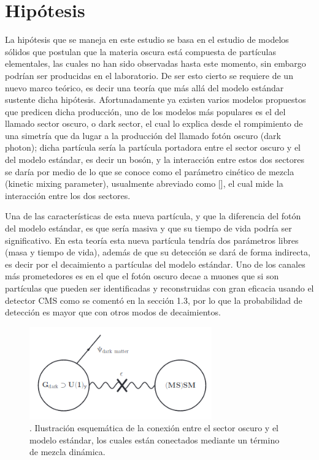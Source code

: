 \chapter{Hipótesis}

La hipótesis que se maneja en este estudio se basa en el estudio de modelos sólidos que postulan que la materia oscura está compuesta de partículas elementales, las cuales no han sido observadas hasta este momento, sin embargo podrían ser producidas en el laboratorio. De ser esto cierto se requiere de un nuevo marco teórico, es decir una teoría que más allá del modelo estándar sustente dicha hipótesis.
Afortunadamente ya existen varios modelos propuestos que predicen dicha
producción, uno de los modelos más populares es el del llamado sector oscuro, o dark sector, el cual lo explica desde el rompimiento de una simetría que da lugar a la producción del llamado fotón oscuro (dark photon); dicha partícula sería la partícula portadora entre el sector oscuro y el del modelo estándar, es decir un bosón, y la interacción entre estos dos sectores se daría por medio de lo que se conoce como el parámetro cinético de mezcla (kinetic mixing parameter), usualmente abreviado como [], el cual mide la interacción entre los dos sectores.

Una de las características de esta nueva partícula, y que la diferencia del fotón del modelo estándar, es que sería masiva y que su tiempo de vida podría ser significativo. En esta teoría esta nueva partícula tendría dos parámetros libres (masa y tiempo de vida), además de que su detección se dará de forma indirecta, es decir por el decaimiento a partículas del modelo estándar. Uno de los canales más prometedores es en el que el fotón oscuro decae a muones que si son partículas que pueden ser identificadas y reconstruidas con gran eficacia usando el detector CMS como se comentó en la sección 1.3, por lo que la probabilidad de detección es mayor que con otros modos de decaimientos.

\begin{figure}
    \centering
    \includegraphics[width=0.7\textwidth]{HIPOTESIS/sketch_darksector.png}
    \caption{. Ilustración esquemática de la conexión entre el sector oscuro y el modelo estándar, los cuales están conectados mediante un término de mezcla dinámica.}
    \label{fig:sketch_darksector}
\end{figure}

